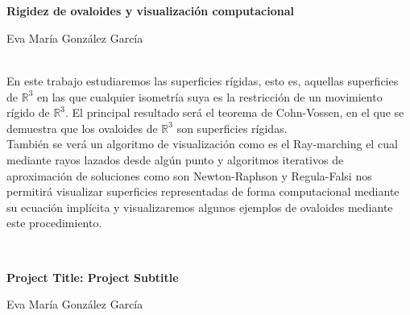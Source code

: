 \chapter*{}






\cleardoublepage
\thispagestyle{empty}

\begin{center}
{\large\bfseries Rigidez de ovaloides y visualización computacional}\\
\end{center}
\begin{center}
Eva María González García\\
\end{center}


\vspace{0.7cm}
\\

En este trabajo estudiaremos las superficies rígidas, esto es, aquellas superficies de $\mathbb{R}^3$ en las que cualquier isometría suya es la restricción de un movimiento rígido de $\mathbb{R}^3$. El principal resultado será el teorema de Cohn-Vossen, en el que se demuestra que los ovaloides de $\mathbb{R}^3$ son superficies rígidas.
${ }$\\

También se verá un algoritmo de visualización como es el Ray-marching el cual mediante rayos lazados desde algún punto y algoritmos iterativos de aproximación de soluciones como son Newton-Raphson y Regula-Falsi nos permitirá visualizar superficies representadas de forma computacional mediante su ecuación implícita y visualizaremos algunos ejemplos de ovaloides mediante este procedimiento.


\vspace{0.7cm}
\\
\cleardoublepage


\thispagestyle{empty}


\begin{center}
{\large\bfseries Project Title: Project Subtitle}\\
\end{center}
\begin{center}
Eva María González García\\
\end{center}

